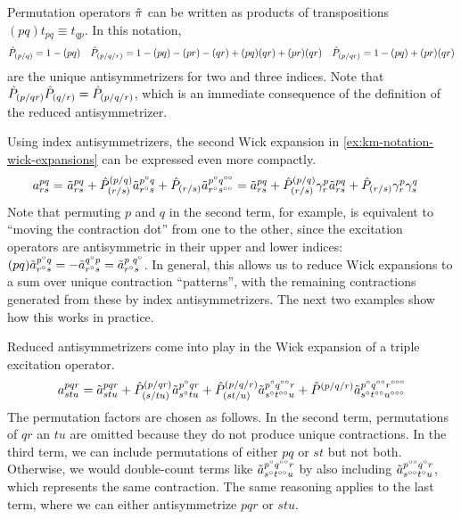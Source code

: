 \documentclass[11pt]{article}
\numberwithin{equation}{section}
\begin{document}
\begin{ex}
Permutation operators $\op{\pi}$ can be written as products of transpositions $(pq)t_{pq}\equiv t_{qp}$.
In this notation,
\begin{align*}
  \hat{P}_{(p/q)}
=
  1
-
  (pq)
&&
  \hat{P}_{(p/q/r)}
=
  1
-
  (pq)
-
  (pr)
-
  (qr)
+
  (pq)(qr)
+
  (pr)(qr)
&&
  \hat{P}_{(p/qr)}
=
  1
-
  (pq)
+
  (pr)(qr)
\end{align*}
are the unique antisymmetrizers for two and three indices.
Note that $\hat{P}_{(p/qr)}\hat{P}_{(q/r)}=\hat{P}_{(p/q/r)}$, which is an immediate consequence of the definition of the reduced antisymmetrizer.
\end{ex}

\begin{ex}
Using index antisymmetrizers, the second Wick expansion in \cref{ex:km-notation-wick-expansions} can be expressed even more compactly.
\begin{align*}
  a^{pq}_{rs}
=&\
  \tilde{a}^{pq}_{rs}
+
  \hat{P}^{(p/q)}_{(r/s)}
  \tilde{a}^{p^\circ q}_{r^\circ s}
+
  \hat{P}_{(r/s)}
  \tilde{a}^{p^\circ q^{\circ\circ}}_{r^\circ s^{\circ\circ}}
=
  \tilde{a}^{pq}_{rs}
+
  \hat{P}^{(p/q)}_{(r/s)}
  \gamma ^p_r
  \tilde{a}^{pq}_{rs}
+
  \hat{P}_{(r/s)}
  \gamma ^p_r
  \gamma ^q_s
\end{align*}
Note that permuting $p$ and $q$ in the second term, for example, is equivalent to ``moving the contraction dot'' from one to the other, since the excitation operators are antisymmetric in their upper and lower indices:
$
  (pq)
  \tilde{a}^{p^\circ q}_{r^\circ s}
=
-
  \tilde{a}^{q^\circ p}_{r^\circ s}
=
  \tilde{a}^{p\,\, q^\circ}_{r^\circ s}
$.
In general, this allows us to reduce Wick expansions to a sum over unique contraction ``patterns'', with the remaining contractions generated from these by index antisymmetrizers.
The next two examples show how this works in practice.
\end{ex}

\begin{ex}
Reduced antisymmetrizers come into play in the Wick expansion of a triple excitation operator.
\begin{align}
  a^{pqr}_{stu}
=
  \tilde{a}^{pqr}_{stu}
+
  \hat{P}^{(p/qr)}_{(s/tu)}
  \tilde{a}^{p^\circ qr}_{s^\circ tu}
+
  \hat{P}^{(p/q/r)}_{(st/u)}
  \tilde{a}^{p^\circ q^{\circ\circ} r}_{s^\circ t^{\circ\circ} u}
+
  \hat{P}^{(p/q/r)}
  \tilde{a}^{p^\circ q^{\circ\circ} r^{\circ\circ\circ}}
        _{s^\circ t^{\circ\circ} u^{\circ\circ\circ}}
\end{align}
The permutation factors are chosen as follows.
In the second term, permutations of $qr$ an $tu$ are omitted because they do not produce unique contractions.
In the third term, we can include permutations of either $pq$ or $st$ but not both.
Otherwise, we would double-count terms like
$
  \tilde{a}^{p^\circ q^{\circ\circ} r}_{s^\circ t^{\circ\circ} u}
$
by also including
$
  \tilde{a}^{p^{\circ\circ} q^\circ r}_{s^{\circ\circ} t^\circ u}
$,
which represents the same contraction.
The same reasoning applies to the last term, where we can either antisymmetrize $pqr$ or $stu$.
\end{ex}
\end{document}
